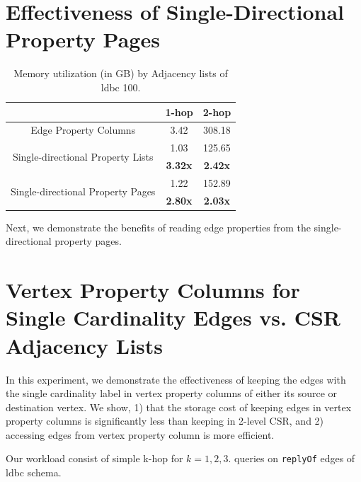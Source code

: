 \section{Effectiveness of Single-Directional Property Pages}
\label{exp:property-pages}

\begin{table}
	\centering
	\bgroup
	\setlength{\tabcolsep}{8pt}
	\def\arraystretch{1.2}%
	\begin{tabular}{ |c|c|c| } 
		\hline
		& 1-hop & 2-hop \\ 
		\hline
		Edge Property Columns& 3.42 & 308.18 \\ 
		\hline
		\multirow{2}{*}{Single-directional Property Lists}& 1.03 & 125.65 \\ 
		& \textbf{3.32x} & \textbf{2.42x} \\ 
		\hline 
		\multirow{2}{*}{Single-directional Property Pages} & 1.22 & 152.89 \\ 
			& \textbf{2.80x} & \textbf{2.03x} \\ 
		\hline 
	\end{tabular}
	\egroup
	\captionsetup{justification=centering}
	\caption{Memory utilization (in GB) by Adjacency lists of \gls{ldbc} 100. }
	\label{tbl:mem1}
\end{table}

Next, we demonstrate the benefits of reading edge properties from the single-directional property pages.

\section{Vertex Property Columns for Single Cardinality Edges vs. CSR Adjacency Lists}
\label{exp:single-cardinality}

In this experiment, we demonstrate the effectiveness of keeping the edges with the single cardinality label in vertex property columns of either its source or destination vertex. We show, 1) that the storage cost of keeping edges in vertex property columns is significantly less than keeping in 2-level CSR, and 2) accessing edges from vertex property column is more efficient. 



Our workload consist of simple k-hop for $k=1,2,3$. queries on \texttt{replyOf} edges of \gls{ldbc} schema. 

